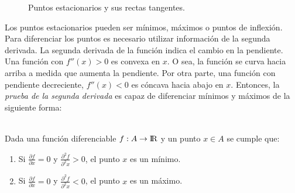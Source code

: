 \begin{figure}
\centering
\caption{Puntos estacionarios y sus rectas tangentes.}
\label{fig:Puntos estacionarios y sus rectas tangentes}
\end{figure}

Los puntos estacionarios pueden ser mínimos, máximos o puntos de inflexión. Para diferenciar los puntos es necesario utilizar información de la segunda derivada.  La segunda derivada de la función indica el cambio en la pendiente. Una función con $f''(x)> 0$ es convexa en $x$. O sea, la función se curva hacia arriba a medida que aumenta la pendiente. Por otra parte, una función con pendiente decreciente, $f'' (x) <0$ es cóncava hacia abajo en $x$. Entonces, la \textit{prueba de la segunda derivada} es capaz de diferenciar mínimos y máximos de la siguiente forma:
\\
\\
\begin{defn}
Dada una función diferenciable $f:A \to {\rm I\!R}$  y un punto $x \in A$ se cumple que:
\begin{enumerate}
\item Si $ \frac{\partial f}{\partial x} =0$ y $\frac{\partial^2 f}{\partial^2 x} >0$, el punto $x$ es un mínimo.
\item Si $ \frac{\partial f}{\partial x} =0$ y  $\frac{\partial^2 f}{\partial^2 x} <0$, el punto $x$ es un máximo.
\end{enumerate}
\end{defn}

